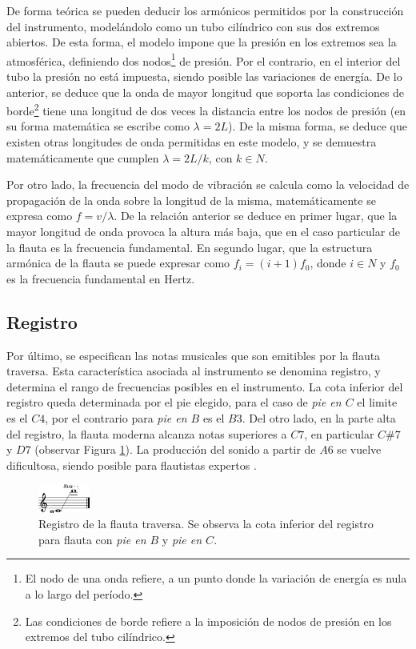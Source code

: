 \documentclass
  [ams,pdfout]%
	{aeslac}
\begin{document}
De forma teórica se pueden deducir los armónicos permitidos por la construcción del instrumento, modelándolo como un tubo cilíndrico con sus dos extremos abiertos. De esta forma, el modelo impone que la presión en los extremos sea la atmosférica, definiendo dos nodos\footnote{El nodo de una onda refiere, a un punto donde la variación de energía es nula a lo largo del período.} de presión. Por el contrario, en el interior del tubo la presión no está impuesta, siendo posible las variaciones de energía. De lo anterior, se deduce que la onda de mayor longitud que soporta las condiciones de borde\footnote{Las condiciones de borde refiere a la imposición de nodos de presión en los extremos del tubo cilíndrico.} tiene una longitud de dos veces la distancia entre los nodos de presión (en su forma matemática se escribe como $\lambda=2L$). De la misma forma, se deduce que existen otras longitudes de onda permitidas en este modelo, y se demuestra matemáticamente que cumplen $\lambda=2L/k$, con $k \in N$.

Por otro lado, la frecuencia del modo de vibración se calcula como la velocidad de propagación de la onda sobre la longitud de la misma, matemáticamente se expresa como $f=v/\lambda$. De la relación anterior se deduce en primer lugar, que la mayor longitud de onda provoca la altura más baja, que en el caso particular de la flauta es la frecuencia fundamental. En segundo lugar, que la estructura armónica de la flauta se puede expresar como $f_{i}=(i+1)f_{0}$, donde $i \in N$ y $f_{0}$ es la frecuencia fundamental en Hertz. 


\subsection*{Registro}

Por último, se especifican las notas musicales que son emitibles por la flauta traversa. Esta característica asociada al instrumento se denomina registro, y determina el rango de frecuencias posibles en el instrumento. La cota inferior del registro queda determinada por el pie elegido, para el caso de \textit{pie en $C$} el limite es el $C4$, por el contrario para \textit{pie en $B$} es el $B3$. Del otro lado, en la parte alta del registro, la flauta moderna alcanza notas superiores a $C7$, en particular $C\#7$ y $D7$ (observar Figura \ref{fig:registro_flauta}). La producción del sonido a partir de $A6$ se vuelve dificultosa, siendo posible para flautistas expertos \cite{samuel2002study}.

\begin{figure}[h!]
\begin{center}
\includegraphics[width=0.15\textwidth]{imagenes/registro_flauta} 
\caption{Registro de la flauta traversa. Se observa la cota inferior del registro para flauta con \textit{pie en $B$} y \textit{pie en $C$}.}
\label{fig:registro_flauta}
\end{center}
\end{figure} 
\end{document}

